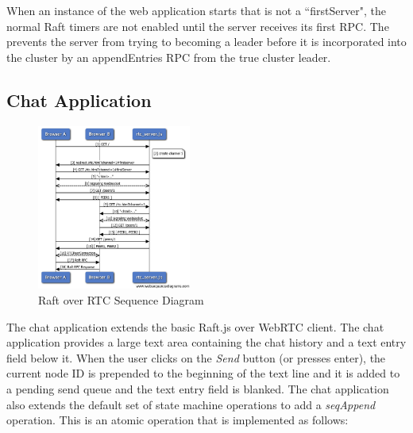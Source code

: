 \documentclass[conference,compsoc]{./IEEEtran/IEEEtran}
\begin{document}
When an instance of the web application starts that is not a ``firstServer", the normal Raft timers are not enabled until the server receives its first RPC. The prevents the server from trying to becoming a leader before it is incorporated into the cluster by an appendEntries RPC from the true cluster leader.

\subsection{Chat Application}

\begin{figure}[!t]
  \centerline{\includegraphics[width=0.45\textwidth]{imgs/raft_rtc_sequence}}
  \caption{Raft over RTC Sequence Diagram}
    \label{fig:raft_rtc_sequence}
\end{figure}

The chat application extends the basic Raft.js over WebRTC client. The chat application provides a large text area containing the chat history and a text entry field below it. When the user clicks on the \emph{Send} button (or presses enter), the current node ID is prepended to the beginning of the text line and it is added to a pending send queue and the text entry field is blanked. The chat application also extends the default set of state machine operations to add a \emph{seqAppend} operation. This is an atomic operation that is implemented as follows:
\end{document}
